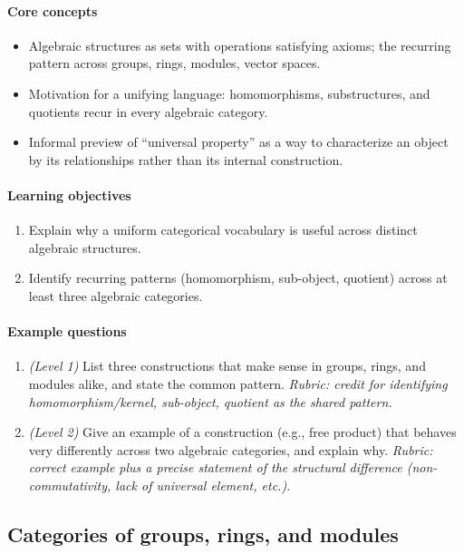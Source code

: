 \documentclass{article}
\begin{document}
\paragraph{Core concepts}
\begin{itemize}[nosep]
  \item Algebraic structures as sets with operations satisfying axioms; the recurring pattern across groups, rings, modules, vector spaces.
  \item Motivation for a unifying language: homomorphisms, substructures, and quotients recur in every algebraic category.
  \item Informal preview of ``universal property'' as a way to characterize an object by its relationships rather than its internal construction.
\end{itemize}
\paragraph{Learning objectives}
\begin{enumerate}[nosep]
  \item Explain why a uniform categorical vocabulary is useful across distinct algebraic structures.
  \item Identify recurring patterns (homomorphism, sub-object, quotient) across at least three algebraic categories.
\end{enumerate}
\paragraph{Example questions}
\begin{enumerate}[nosep]
  \item \emph{(Level 1)} List three constructions that make sense in groups, rings, and modules alike, and state the common pattern. \emph{Rubric: credit for identifying homomorphism/kernel, sub-object, quotient as the shared pattern.}
  \item \emph{(Level 2)} Give an example of a construction (e.g., free product) that behaves very differently across two algebraic categories, and explain why. \emph{Rubric: correct example plus a precise statement of the structural difference (non-commutativity, lack of universal element, etc.).}
\end{enumerate}

\subsection{Categories of groups, rings, and modules}
\end{document}
